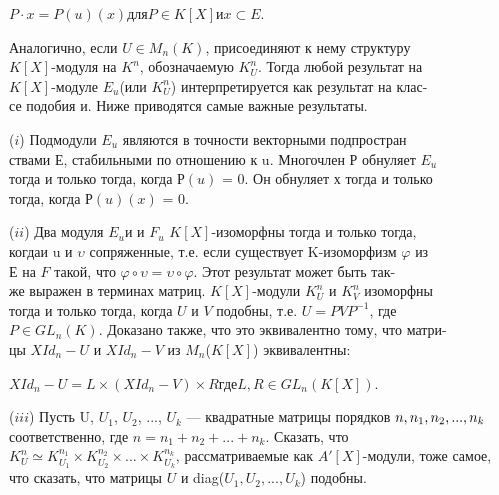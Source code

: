 \medskip

$P\cdot x = P(u)(x)$\;\;для\;\;$P\in K[X]$\;\;и\;\;$x\subset E$. 

\medskip

\noindent Аналогично, если $ U \in M_n(K)$, присоединяют к нему структуру\\ 
$K[X]$-модуля на $K^n$, обозначаемую $K_U^n$. Тогда любой результат на\\ 
$K[X]$-модуле $E_u$(или $K_U^n$) интерпретируется как результат на 
клас-\\се подобия и. Ниже приводятся самые важные результаты.

\medskip

($\mathit{i} $) Подмодули $E_u$ являются в точности векторными 
подпростран\\ствами Е, стабильными по отношению к u. Многочлен Р обнуляет $E_u$ \\тогда и только тогда, когда $Р(u)$ = 0. Он обнуляет х тогда и только\\ тогда, когда $Р(u)(x)$ = 0. 

\medskip

($\mathit{ii} $) Два модуля $E_u$и и $F_u$ $K[X]$-изоморфны тогда и только тогда,\\ когдаи u и $\upsilon$ сопряженные, т.е. если существует K-изоморфизм $\varphi$ из\\
$Е$ на $F$ такой, что $\varphi\circ\upsilon = \upsilon\circ\varphi$. Этот результат может быть 
так-\\же выражен в терминах матриц. $K[X]$-модули $K^n_U$ и $K^n_V$ изоморфны\\
тогда и только тогда, когда $U$ и $V$ подобны, т.е. $U = PVP^{-1}$, где\\ 
$P \in GL_n(K)$. Доказано также, что это эквивалентно тому, что 
матри-\\цы  $XId_n - U$ и $XId_n - V$ из $M_n$($K[X]$) эквивалентны:

\medskip

$XId_n - U = L\times (XId_n - V)\times R$\;\;где\;\;$L,R\in GL_n(K[X])$. 

\medskip

($\mathit{iii} $) Пусть U, $U_1$, $U_2$, ..., $U_k$ — квадратные матрицы порядков  
$n,\\n_1, n_2,..., n_k $ соответственно, где $n=n_1+n_2+...+ n_k $. Сказать, что\\
$ K^n_U\simeq K^{n_1}_{U_1}\times K^{n_2}_{U_2}\times...\times K^{n_k}_{U_k} $, рассматриваемые как $A'[X]$-модули, тоже 
самое, что сказать, что матрицы $U$ и diag($U_1, U_2,..., U_k$) подобны.

